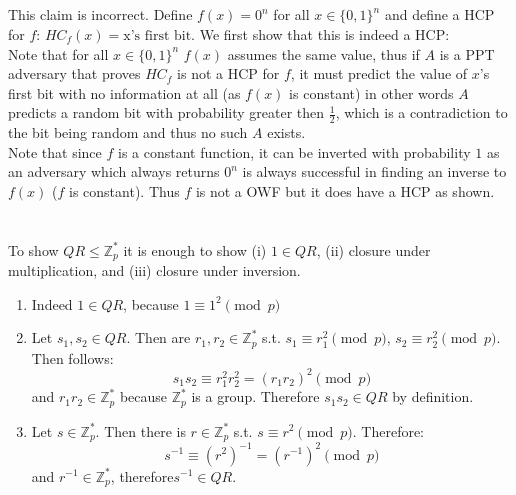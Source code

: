 \documentclass{article}
\begin{document}
\subsection{}
This claim is incorrect.
Define $f(x) = 0^n$ for all $x \in \{0,1\}^n$ and define a HCP for $f$: $HC_f(x) = \mbox{x's first bit}$.
We first show that this is indeed a HCP:\\
Note that for all $x \in \{0,1\}^n$ $f(x)$ assumes the same value, thus if $A$ is a PPT adversary that proves $HC_f$ is not a HCP for $f$, it must predict the value of $x$'s 
first bit with no information at all (as $f(x)$ is constant) in other words $A$ predicts a random bit with probability greater then $\frac{1}{2}$, which is a contradiction to the bit being random and thus no such $A$ exists.\\
Note that since $f$ is a constant function, it can be inverted with probability $1$ as an adversary which always returns $0^n$ is always successful in finding an inverse to $f(x)$ ($f$ is constant). Thus $f$ is not a OWF but it does have a HCP as shown.

\section{}
\subsection{}
To show $QR\leq\mathbb{Z}_{p}^{*}$ it is enough to show (i) $1\in QR$,
(ii) closure under multiplication, and (iii) closure under inversion.

\begin{enumerate}[i]
\item Indeed $1\in QR$, because $1\equiv1^{2}\pmod p$
\item Let $s_{1},s_{2}\in QR$. Then are $r_{1},r_{2}\in\mathbb{Z}_{p}^{*}$
s.t. $s_{1}\equiv r_{1}^{2}\pmod p$, $s_{2}\equiv r_{2}^{2}\pmod p$.
Then follows:
\[
s_{1}s_{2}\equiv r_{1}^{2}r_{2}^{2}=\left(r_{1}r_{2}\right)^{2}\pmod p
\]
 and $r_{1}r_{2}\in\mathbb{Z}_{p}^{*}$ because $\mathbb{Z}_{p}^{*}$
is a group. Therefore $s_{1}s_{2}\in QR$ by definition.
\item Let $s\in\mathbb{Z}_{p}^{*}$. Then there is $r\in\mathbb{Z}_{p}^{*}$
s.t. $s\equiv r^{2}\pmod p$. Therefore:
\[
s^{-1}\equiv\left(r^{2}\right)^{-1}=\left(r^{-1}\right)^{2}\pmod p
\]
and $r^{-1}\in\mathbb{Z}_{p}^{*}$, therefore$s^{-1}\in QR$.
\end{enumerate}
\end{document}
